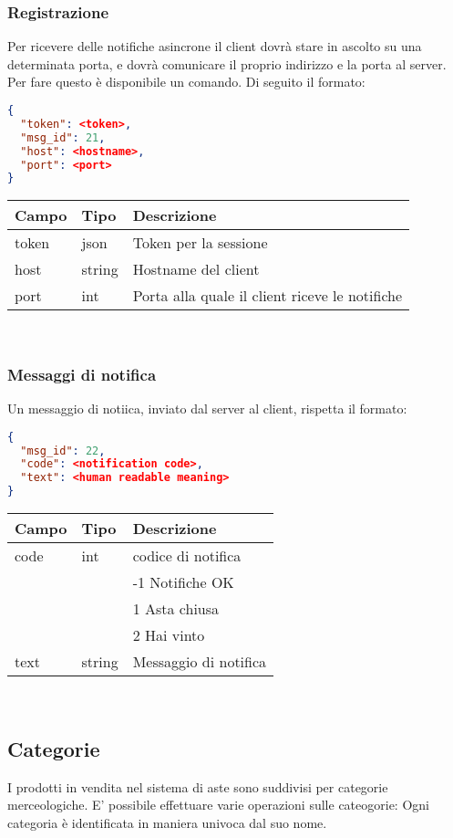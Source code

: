 \subsubsection{Registrazione}
Per ricevere delle notifiche asincrone il client dovrà stare in ascolto su una determinata porta, e dovrà comunicare il proprio indirizzo e la porta al server. Per fare questo è disponibile un comando. Di seguito il formato:\\
\begin{lstlisting}[language=json]
{
  "token": <token>,
  "msg_id": 21,
  "host": <hostname>,
  "port": <port>
}
\end{lstlisting}

\begin{tabular}{|l | l | l |}
\hline
Campo & Tipo & Descrizione \\ \hline
token & json & Token per la sessione \\ \hline
host & string & Hostname del client  \\ \hline
port & int & Porta alla quale il client riceve le notifiche  \\ \hline
\end{tabular} \\
\subsubsection{Messaggi di notifica}
Un messaggio di notiica, inviato dal server al client, rispetta il formato:
\begin{lstlisting}[language=json]
{
  "msg_id": 22,
  "code": <notification code>,
  "text": <human readable meaning>
}
\end{lstlisting}
\begin{tabular}{|l | l | l |}
\hline
Campo & Tipo & Descrizione \\ \hline
code & int & codice di notifica \\
& & -1 Notifiche OK \\
& & 1 Asta chiusa\\
& & 2 Hai vinto\\ \hline
text & string & Messaggio di notifica \\ \hline
\end{tabular} \\


\subsection{Categorie}
I prodotti in vendita nel sistema di aste sono suddivisi per categorie merceologiche. E' possibile effettuare varie operazioni sulle cateogorie:
Ogni categoria è identificata in maniera univoca dal suo nome.
